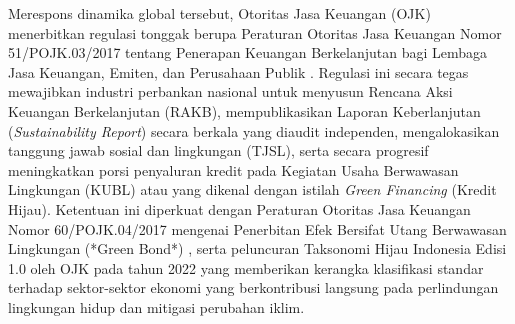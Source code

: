 \documentclass[12pt,a4paper]{article}
\numberwithin{equation}{section}
\begin{document}
\noindent
Merespons dinamika global tersebut, Otoritas Jasa Keuangan (OJK) menerbitkan regulasi tonggak berupa Peraturan Otoritas Jasa Keuangan Nomor 51/POJK.03/2017 tentang Penerapan Keuangan Berkelanjutan bagi Lembaga Jasa Keuangan, Emiten, dan Perusahaan Publik \citep{OJK2017}. Regulasi ini secara tegas mewajibkan industri perbankan nasional untuk menyusun Rencana Aksi Keuangan Berkelanjutan (RAKB), mempublikasikan Laporan Keberlanjutan (\emph{Sustainability Report}) secara berkala yang diaudit independen, mengalokasikan tanggung jawab sosial dan lingkungan (TJSL), serta secara progresif meningkatkan porsi penyaluran kredit pada Kegiatan Usaha Berwawasan Lingkungan (KUBL) atau yang dikenal dengan istilah \emph{Green Financing} (Kredit Hijau). Ketentuan ini diperkuat dengan Peraturan Otoritas Jasa Keuangan Nomor 60/POJK.04/2017 mengenai Penerbitan Efek Bersifat Utang Berwawasan Lingkungan (*Green Bond*) \citep{OJK2017b}, serta peluncuran Taksonomi Hijau Indonesia Edisi 1.0 oleh OJK pada tahun 2022 \citep{OJK2022} yang memberikan kerangka klasifikasi standar terhadap sektor-sektor ekonomi yang berkontribusi langsung pada perlindungan lingkungan hidup dan mitigasi perubahan iklim.
\end{document}

